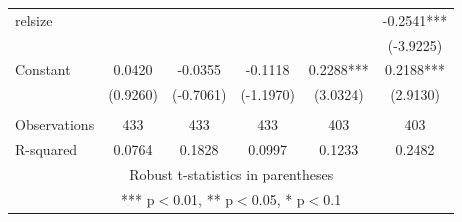 \documentclass[12pt]{article}
\begin{document}
\begin{adjustbox}{max width=\textwidth}
\begin{tabular}{lccccc}
   relsize &  &  &  &  & -0.2541*** \\
	&  &  &  &  & (-3.9225) \\
   Constant & 0.0420 & -0.0355 & -0.1118 & 0.2288*** & 0.2188*** \\
	& (0.9260) & (-0.7061) & (-1.1970) & (3.0324) & (2.9130) \\
	&  &  &  &  &  \\
   Observations & 433 & 433 & 433 & 403 & 403 \\
	R-squared & 0.0764 & 0.1828 & 0.0997 & 0.1233 & 0.2482 \\ \hline
   \multicolumn{6}{c}{ Robust t-statistics in parentheses} \\
   \multicolumn{6}{c}{ *** p$<$0.01, ** p$<$0.05, * p$<$0.1} \\
   \end{tabular}
\end{adjustbox}
\end{document}
